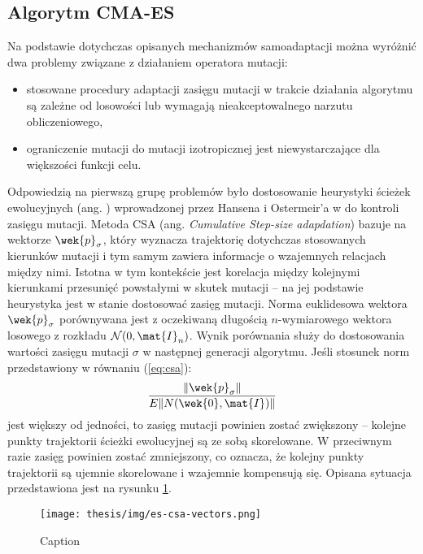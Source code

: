 \subsection{Algorytm CMA-ES}
\label{subsec:cma-es}
    Na podstawie dotychczas opisanych mechanizmów samoadaptacji można wyróżnić dwa problemy związane z działaniem operatora mutacji:
    \begin{itemize}
        \item{stosowane procedury adaptacji zasięgu mutacji w trakcie działania algorytmu są zależne od losowości lub wymagają nieakceptowalnego narzutu obliczeniowego,}
        \item{ograniczenie mutacji do mutacji izotropicznej jest niewystarczające dla większości funkcji celu.} 
    \end{itemize}
    Odpowiedzią na pierwszą grupę problemów było dostosowanie heurystyki ścieżek ewolucyjnych (ang. ) wprowadzonej przez Hansena i  Ostermeir'a w \cite{Hansen:2001} do kontroli zasięgu mutacji. Metoda CSA (ang. \textit{Cumulative Step-size adapdation}) bazuje na wektorze $\wek{p}_{\sigma}$, który wyznacza trajektorię dotychczas stosowanych kierunków mutacji i tym samym zawiera informacje o wzajemnych relacjach między nimi. 
    Istotna w tym kontekście jest korelacja między kolejnymi kierunkami przesunięć powstałymi w skutek mutacji -- na jej podstawie heurystyka jest w stanie dostosować zasięg mutacji. 
    Norma euklidesowa wektora $\wek{p}_\sigma$ porównywana jest z
    oczekiwaną długością $n$-wymiarowego wektora losowego z rozkładu $\mathcal{N}(0, \mat{I}_n)$. Wynik porównania służy do dostosowania 
    wartości zasięgu mutacji $\sigma$ w następnej generacji algorytmu. Jeśli stosunek norm przedstawiony w równaniu (\ref{eq:csa}):
    \begin{equation}
        \label{eq:csa}
        \frac{\|\wek{p}_\sigma\|}{E\|N(\wek{0},\mat{I})\|}
    \end{equation}  
    jest większy od jedności, to zasięg mutacji powinien zostać zwiększony -- kolejne punkty trajektorii ścieżki ewolucyjnej są ze sobą skorelowane. W przeciwnym razie zasięg powinien zostać zmniejszony, co oznacza, że kolejny punkty trajektorii są ujemnie skorelowane i wzajemnie kompensują się. Opisana sytuacja przedstawiona jest na rysunku \ref{fig:csa}.
    \begin{figure}
        \centering
        \texttt{[image: thesis/img/es-csa-vectors.png]}
        \caption{Caption}
        \label{fig:csa}
    \end{figure}
